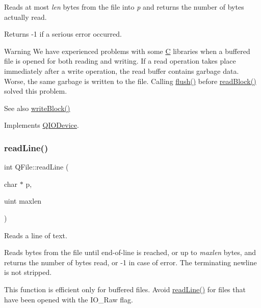 Reads at most {\itshape len} bytes from the file into {\itshape p} and returns the number of bytes actually read.

Returns -\/1 if a serious error occurred.

\begin{DoxyWarning}{Warning}
We have experienced problems with some \mbox{\hyperlink{class_c}{C}} libraries when a buffered file is opened for both reading and writing. If a read operation takes place immediately after a write operation, the read buffer contains garbage data. Worse, the same garbage is written to the file. Calling \mbox{\hyperlink{class_q_file_a6d450a55bc3a8145fd33a7ee08051830}{flush()}} before \mbox{\hyperlink{class_q_file_ab9a42e65a2fcd51bae5f2a186ff5bee5}{read\+Block()}} solved this problem.
\end{DoxyWarning}
\begin{DoxySeeAlso}{See also}
\mbox{\hyperlink{class_q_file_a47e0572e396a6e953d14ba69bf733cea}{write\+Block()}} 
\end{DoxySeeAlso}


Implements \mbox{\hyperlink{class_q_i_o_device_a71f10647e4bd98141f45362b9a06983a}{Q\+I\+O\+Device}}.

\mbox{\label{class_q_file_af95c756ce6ff9f597ff1d21c8384d777}} 
\subsubsection{\texorpdfstring{readLine()}{readLine()}\hspace{0.1cm}{\footnotesize\ttfamily [1/2]}}
{\footnotesize\ttfamily int Q\+File\+::read\+Line (\begin{DoxyParamCaption}\item[{char $\ast$}]{p,  }\item[{uint}]{maxlen }\end{DoxyParamCaption})\hspace{0.3cm}{\ttfamily [virtual]}}

Reads a line of text.

Reads bytes from the file until end-\/of-\/line is reached, or up to {\itshape maxlen} bytes, and returns the number of bytes read, or -\/1 in case of error. The terminating newline is not stripped.

This function is efficient only for buffered files. Avoid \mbox{\hyperlink{class_q_file_af95c756ce6ff9f597ff1d21c8384d777}{read\+Line()}} for files that have been opened with the {\ttfamily I\+O\+\_\+\+Raw} flag.

